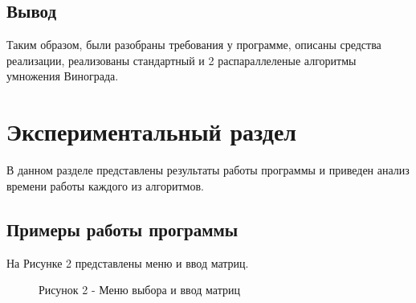 \documentclass[14pt, a4paper]{extarticle}
\begin{document}
	\subsection*{Вывод}
	Таким образом, были разобраны требования у программе, описаны средства реализации, реализованы стандартный и 2 распараллеленые алгоритмы умножения Винограда.  
	
	\clearpage
	\section{Экспериментальный раздел}
	В данном разделе представлены результаты работы программы и приведен анализ времени работы каждого из алгоритмов.
	
	\subsection{Примеры работы программы}
	На Рисунке 2 представлены меню и ввод матриц.
	\begin{figure}[h]
		\caption*{Рисунок 2 - Меню выбора и ввод матриц}
	\end{figure}
	
\end{document}
